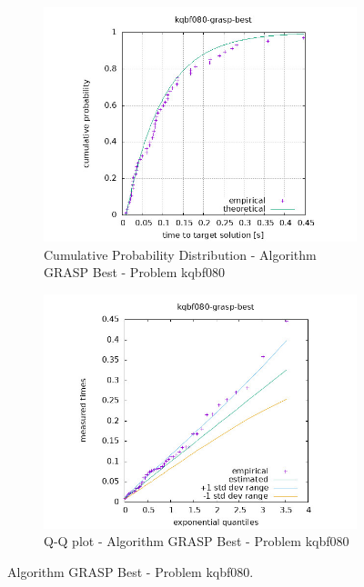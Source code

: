\begin{figure}[H]
    \centering
    \begin{subfigure}{0.49\textwidth}
        \includegraphics[width=\textwidth]{figure/ttt_plot/kqbf080-grasp-best-exp.jpeg}
        \caption{Cumulative Probability Distribution - Algorithm GRASP Best - Problem kqbf080}
        \label{fig:grasp-best-kqbf080-exp}
    \end{subfigure}
    \hfill
    \begin{subfigure}{0.49\textwidth}
        \includegraphics[width=\textwidth]{figure/ttt_plot/kqbf080-grasp-best-qq.jpeg}
        \caption{Q-Q plot - Algorithm GRASP Best - Problem kqbf080}
        \label{fig:grasp-best-kqbf080-qq}
    \end{subfigure}
    \caption{Algorithm GRASP Best - Problem kqbf080.}
    \label{fig:grasp-best-kqbf080}
\end{figure}


